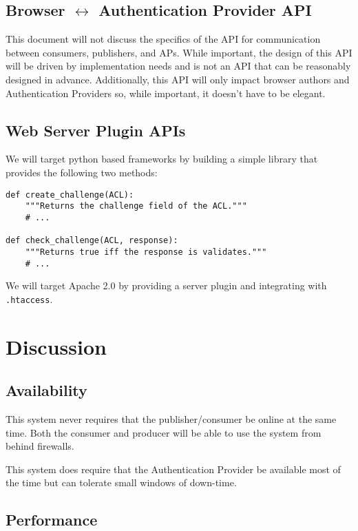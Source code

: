 \documentclass[pdftex,12pt,a4papaer]{article}
\begin{document}
\subsection{Browser $\leftrightarrow$ Authentication Provider API}

This document will not discuss the specifics of the API for communication
between consumers, publishers, and APs. While important, the design of this API
will be driven by implementation needs and is not an API that can be reasonably
designed in advance. Additionally, this API will only impact browser authors and
Authentication Providers so, while important, it doesn't have to be elegant.

\subsection{Web Server Plugin APIs}

We will target python based frameworks by building a simple library that
provides the following two methods:

\begin{verbatim}
def create_challenge(ACL):
    """Returns the challenge field of the ACL."""
    # ...

def check_challenge(ACL, response):
    """Returns true iff the response is validates."""
    # ...
\end{verbatim}

We will target Apache 2.0 by providing a server plugin and integrating with
\texttt{.htaccess}.

\section{Discussion}

\subsection{Availability}

This system never requires that the publisher/consumer be online at the same
time. Both the consumer and producer will be able to use the system from behind
firewalls.

This system does require that the Authentication Provider be available most of
the time but can tolerate small windows of down-time. %

\subsection{Performance}
\end{document}
